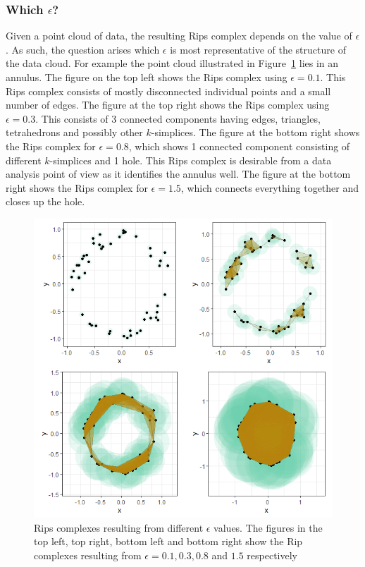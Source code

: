 \documentclass[letter,12pt]{article}
\begin{document}
\subsubsection{Which $\epsilon$?}\label{subsubsec:whicheps}
Given a point cloud of data, the resulting Rips complex depends on the value of $\epsilon$. As such, the question arises which $\epsilon$ is most representative of the structure of the data cloud. For example the point cloud illustrated in Figure~\ref{fig:annulus} lies in an annulus. The figure on the top left shows the Rips complex using $\epsilon = 0.1$. This Rips complex consists of mostly disconnected individual points and a small number of edges. The figure at the top right shows the Rips complex using $\epsilon = 0.3$. This consists of $3$ connected components having edges, triangles, tetrahedrons and possibly other $k$-simplices. The figure at the bottom right shows the Rips complex for $\epsilon = 0.8$, which shows 1 connected component consisting of different $k$-simplices and 1 hole. This Rips complex is desirable from a data analysis point of view as it identifies the annulus well. The figure at the bottom right shows the Rips complex for $\epsilon = 1.5$, which connects everything together and closes up the hole. 

\begin{figure}
    \centering
    \includegraphics[scale=0.8]{four_plots_diff_radi.png}
    \caption{Rips complexes resulting from different $\epsilon$ values. The figures in the top left, top right, bottom left and bottom right show the Rip complexes resulting from $\epsilon = 0.1, 0.3, 0.8$ and $1.5$ respectively}
    \label{fig:annulus}
\end{figure}
\end{document}
